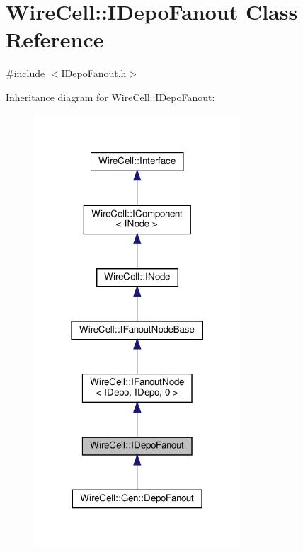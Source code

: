 \hypertarget{class_wire_cell_1_1_i_depo_fanout}{}\section{Wire\+Cell\+:\+:I\+Depo\+Fanout Class Reference}
\label{class_wire_cell_1_1_i_depo_fanout}


{\ttfamily \#include $<$I\+Depo\+Fanout.\+h$>$}



Inheritance diagram for Wire\+Cell\+:\+:I\+Depo\+Fanout\+:
\nopagebreak
\begin{figure}[H]
\begin{center}
\leavevmode
\includegraphics[width=219pt]{class_wire_cell_1_1_i_depo_fanout__inherit__graph}
\end{center}
\end{figure}


